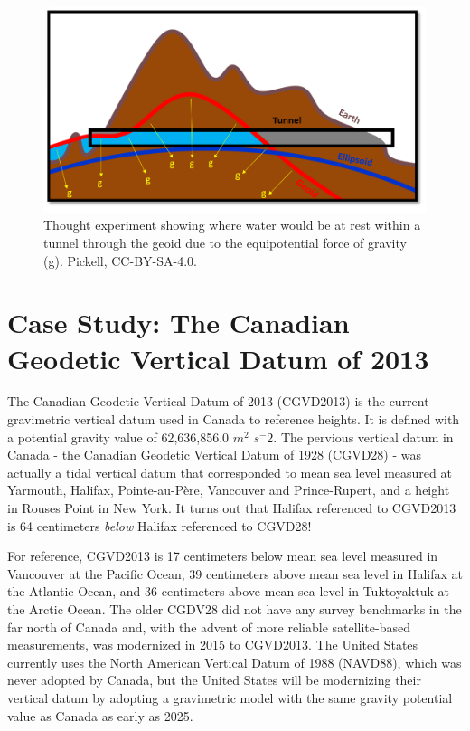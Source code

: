 \documentclass[
]{book}
\begin{document}
\begin{figure}
\includegraphics[width=0.75\linewidth]{images/02-geoid-tunnel} \caption{Thought experiment showing where water would be at rest within a tunnel through the geoid due to the equipotential force of gravity (g). Pickell, CC-BY-SA-4.0.}\label{fig:2-geoid-tunnel}
\end{figure}

\section{Case Study: The Canadian Geodetic Vertical Datum of 2013}\label{case-study-the-canadian-geodetic-vertical-datum-of-2013}

The Canadian Geodetic Vertical Datum of 2013 (CGVD2013) is the current gravimetric vertical datum used in Canada to reference heights. It is defined with a potential gravity value of 62,636,856.0 \(m^2\) \(s^-2\). The pervious vertical datum in Canada - the Canadian Geodetic Vertical Datum of 1928 (CGVD28) - was actually a tidal vertical datum that corresponded to mean sea level measured at Yarmouth, Halifax, Pointe-au-Père, Vancouver and Prince-Rupert, and a height in Rouses Point in New York. It turns out that Halifax referenced to CGVD2013 is 64 centimeters \emph{below} Halifax referenced to CGVD28!

For reference, CGVD2013 is 17 centimeters below mean sea level measured in Vancouver at the Pacific Ocean, 39 centimeters above mean sea level in Halifax at the Atlantic Ocean, and 36 centimeters above mean sea level in Tuktoyaktuk at the Arctic Ocean. The older CGDV28 did not have any survey benchmarks in the far north of Canada and, with the advent of more reliable satellite-based measurements, was modernized in 2015 to CGVD2013. The United States currently uses the North American Vertical Datum of 1988 (NAVD88), which was never adopted by Canada, but the United States will be modernizing their vertical datum by adopting a gravimetric model with the same gravity potential value as Canada as early as 2025.
\end{document}
